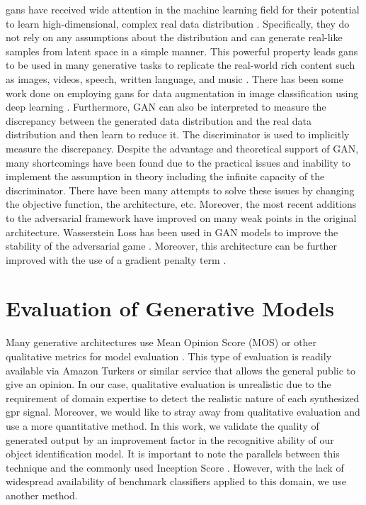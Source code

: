\acrlong{gans} have received wide attention in the machine learning field for their potential to learn high-dimensional, complex real data distribution \cite{GAN, overview}. Specifically, they do not rely on any assumptions about the distribution and can generate real-like samples from latent space in a simple manner. This powerful property leads \acrshort{gans} to be used in many generative tasks to replicate the real-world rich content such as images, videos, speech, written language, and music \cite{overview}. There has been some work done on employing \acrshort{gans} for data augmentation in image classification using deep learning \cite{overview}. Furthermore, GAN can also be interpreted to measure the discrepancy between the generated data distribution and the real data distribution and then learn to reduce it. The discriminator is used to implicitly measure the discrepancy. Despite the advantage and theoretical support of GAN, many shortcomings have been found due to the practical issues and inability to implement the assumption in theory including the infinite capacity of the discriminator. There have been many attempts to solve these issues by changing the objective function, the architecture, etc. Moreover, the most recent additions to the adversarial framework have improved on many weak points in the original architecture. Wasserstein Loss has been used in GAN models to improve the stability of the adversarial game \cite{WGAN}. Moreover, this architecture can be further improved with the use of a gradient penalty term \cite{WGAN-GP}.


\section{Evaluation of Generative Models} \label{Evaluation of Generative Models}

Many generative architectures use Mean Opinion Score (MOS) or other qualitative metrics for model evaluation \cite{MOS}. This type of evaluation is readily available via Amazon Turkers or similar service that allows the general public to give an opinion. In our case, qualitative evaluation is unrealistic due to the requirement of domain expertise to detect the realistic nature of each synthesized \acrshort{gpr} signal. Moreover, we would like to stray away from qualitative evaluation and use a more quantitative method. In this work, we validate the quality of generated output by an improvement factor in the recognitive ability of our object identification model. It is important to note the parallels between this technique and the commonly used Inception Score \cite{inception}. However, with the lack of widespread availability of benchmark classifiers applied to this domain, we use another method.

